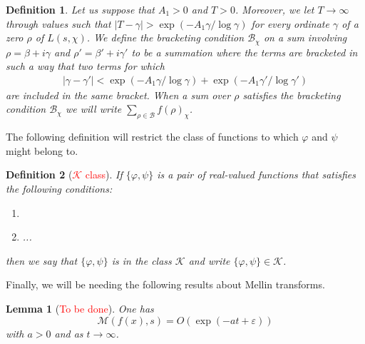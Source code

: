 \documentclass[11pt]{article}
\newtheorem{lemma}{Lemma}[section]
\newtheorem{definition}{Definition}[section]
\numberwithin{equation}{section}		 			%
\numberwithin{figure}{section}			 			%
\begin{document}
\begin{definition} \label{dirichlet_bracketing_condition}
Let us suppose that $A_1>0$ and $T>0$. Moreover, we let $T \to \infty$ through values such that $\left| {T - \gamma } \right| > \exp ( - A_1 \gamma /\log \gamma)$ for every ordinate $\gamma$ of a zero $\rho$ of $L(s,\chi)$. We define the bracketing condition $\mathcal{B}_\chi$ on a sum involving $\rho = \beta + i \gamma$ and $\rho' = \beta' + i \gamma'$ to be a summation where the terms are bracketed in such a way that two terms for which
\begin{align} \label{dirichlet_bracketing_condition_eq}
\left| {\gamma  - \gamma '} \right| < \exp ( - A_1 \gamma /\log \gamma ) + \exp ( - A_1 \gamma '/\log \gamma ')
\end{align}
are included in the same bracket. When a sum over $\rho$ satisfies the bracketing condition $\mathcal{B}_\chi$ we will write $\sum_{\rho \in \mathcal{B}}{f(\rho)}_\chi$.
\end{definition}
\noindent The following definition will restrict the class of functions to which $\varphi$ and $\psi$ might belong to.
\begin{definition}[\textcolor{red}{$\mathcal{K}$ class}]
\noindent If $\{\varphi, \psi \}$ is a pair of real-valued functions that satisfies the following conditions:
\begin{enumerate}
\item[\emph{1}]
\item[\emph{2}] ...
\end{enumerate}
then we say that $\{\varphi, \psi \}$ is in the class $\mathcal{K}$ and write $\{\varphi, \psi \} \in \mathcal{K}$.
\end{definition}
\noindent Finally, we will be needing the following results about Mellin transforms.
\begin{lemma}[\textcolor{red}{To be done}]
One has
\[\mathcal{M}(f(x),s) = O(\exp(-at + \varepsilon))\]
with $a>0$ and as $t \to \infty$.
\end{lemma}
\end{document}
